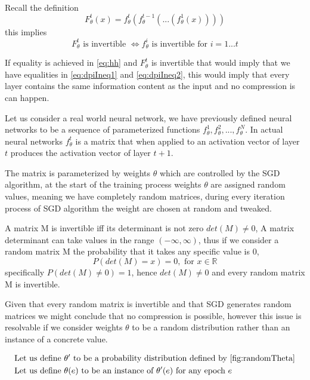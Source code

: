 Recall the definition
\begin{equation*}
  F_{\theta}^t(x) = f_{\theta}^t(f_{\theta}^{t-1}(...(f_{\theta}^1(x))))
\end{equation*}
this implies 
\begin{equation*}
  F_\theta^t \text{ is invertible } \iff f_\theta^i \text{ is invertible
  for } i = 1...t
\end{equation*}

If equality is achieved in \autoref{eq:hh} and $F_\theta^t$ is invertible that
would imply that we have equalities in \autoref{eq:dpiIneq1} and
\autoref{eq:dpiIneq2}, this would imply that every layer contains the same
information content as the input and no compression is can happen.

Let us consider a real world neural network, we have previously defined neural
networks to be a sequence of parameterized functions
$f_{\theta}^1, f_{\theta}^2, ...  ,f_{\theta}^N$. In actual neural networks
$f_\theta^t$ is a matrix that when applied to an activation vector of layer $t$
produces the activation vector of layer $t+1$. 

The matrix is parameterized by weights $\theta$ which are controlled by the SGD
algorithm, at the start of the training process weights $\theta$ are assigned
random values, meaning we have completely random matrices, during every
iteration process of SGD algorithm the weight are chosen at random and
tweaked.

A matrix M is invertible iff its determinant is not zero $det(M) \neq 0$, A
matrix determinant can take values in the range $(-\infty, \infty)$, thus if we
consider a random matrix M the probability that it takes any specific value is
0, 
\begin{equation*}
  P(det(M) = x) = 0, \text{ for } x \in \mathbb{R}
\end{equation*}
specifically $P(det(M) \neq 0) = 1$, hence $det(M) \neq 0$ and every random
matrix M is invertible.

Given that every random matrix is invertible and that SGD generates random
matrices we might conclude that no compression is possible, however this issue
is resolvable if we consider weights $\theta$ to be a random distribution rather
than an instance of a concrete value. 

\begin{align*}
  &\text{Let us define } \theta^\prime \text{ to be a probability distribution
  defined by \autoref{fig:randomTheta}} \\
  &\text{Let us define } \theta(e) \text{ to be an instance of }
  \theta^\prime(e) \text{ for any epoch } e \\
\end{align*}

